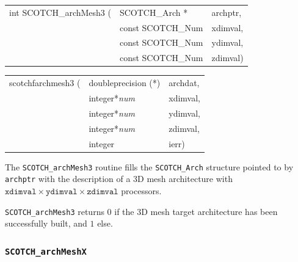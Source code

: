 \begin{itemize}
\progsyn

{\tt\begin{tabular}{l@{}ll}
int SCOTCH\_archMesh3 ( & SCOTCH\_Arch *    & archptr, \\
                        & const SCOTCH\_Num & xdimval, \\
                        & const SCOTCH\_Num & ydimval, \\
                        & const SCOTCH\_Num & zdimval) \\
\end{tabular}}

{\tt\begin{tabular}{l@{}ll}
scotchfarchmesh3 ( & doubleprecision (*) & archdat, \\
                   & integer*{\it num}   & xdimval, \\
                   & integer*{\it num}   & ydimval, \\
                   & integer*{\it num}   & zdimval, \\
                   & integer             & ierr)
\end{tabular}}

\progdes

The {\tt SCOTCH\_archMesh3} routine fills the {\tt SCOTCH\_\lbt Arch}
structure pointed to by {\tt archptr} with the description of a
3D mesh architecture with $\mathtt{xdimval} \times \mathtt{ydimval}
\times \mathtt{zdimval}$ processors.

\progret

{\tt SCOTCH\_archMesh3} returns $0$ if the 3D mesh target
architecture has been successfully built, and $1$ else.
\end{itemize}

\subsubsection{{\tt SCOTCH\_archMeshX}}

